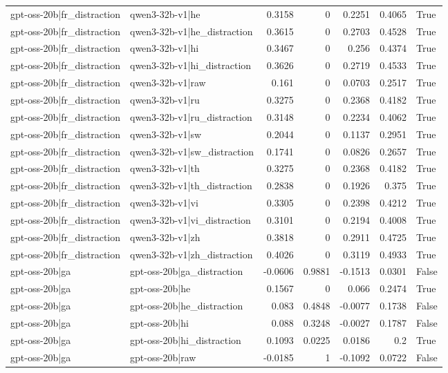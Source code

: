 \begin{table}
\begin{tabular}{l l r r r r l}
gpt-oss-20b|fr_distraction & qwen3-32b-v1|he & 0.3158 & 0 & 0.2251 & 0.4065 & True \\
gpt-oss-20b|fr_distraction & qwen3-32b-v1|he_distraction & 0.3615 & 0 & 0.2703 & 0.4528 & True \\
gpt-oss-20b|fr_distraction & qwen3-32b-v1|hi & 0.3467 & 0 & 0.256 & 0.4374 & True \\
gpt-oss-20b|fr_distraction & qwen3-32b-v1|hi_distraction & 0.3626 & 0 & 0.2719 & 0.4533 & True \\
gpt-oss-20b|fr_distraction & qwen3-32b-v1|raw & 0.161 & 0 & 0.0703 & 0.2517 & True \\
gpt-oss-20b|fr_distraction & qwen3-32b-v1|ru & 0.3275 & 0 & 0.2368 & 0.4182 & True \\
gpt-oss-20b|fr_distraction & qwen3-32b-v1|ru_distraction & 0.3148 & 0 & 0.2234 & 0.4062 & True \\
gpt-oss-20b|fr_distraction & qwen3-32b-v1|sw & 0.2044 & 0 & 0.1137 & 0.2951 & True \\
gpt-oss-20b|fr_distraction & qwen3-32b-v1|sw_distraction & 0.1741 & 0 & 0.0826 & 0.2657 & True \\
gpt-oss-20b|fr_distraction & qwen3-32b-v1|th & 0.3275 & 0 & 0.2368 & 0.4182 & True \\
gpt-oss-20b|fr_distraction & qwen3-32b-v1|th_distraction & 0.2838 & 0 & 0.1926 & 0.375 & True \\
gpt-oss-20b|fr_distraction & qwen3-32b-v1|vi & 0.3305 & 0 & 0.2398 & 0.4212 & True \\
gpt-oss-20b|fr_distraction & qwen3-32b-v1|vi_distraction & 0.3101 & 0 & 0.2194 & 0.4008 & True \\
gpt-oss-20b|fr_distraction & qwen3-32b-v1|zh & 0.3818 & 0 & 0.2911 & 0.4725 & True \\
gpt-oss-20b|fr_distraction & qwen3-32b-v1|zh_distraction & 0.4026 & 0 & 0.3119 & 0.4933 & True \\
gpt-oss-20b|ga & gpt-oss-20b|ga_distraction & -0.0606 & 0.9881 & -0.1513 & 0.0301 & False \\
gpt-oss-20b|ga & gpt-oss-20b|he & 0.1567 & 0 & 0.066 & 0.2474 & True \\
gpt-oss-20b|ga & gpt-oss-20b|he_distraction & 0.083 & 0.4848 & -0.0077 & 0.1738 & False \\
gpt-oss-20b|ga & gpt-oss-20b|hi & 0.088 & 0.3248 & -0.0027 & 0.1787 & False \\
gpt-oss-20b|ga & gpt-oss-20b|hi_distraction & 0.1093 & 0.0225 & 0.0186 & 0.2 & True \\
gpt-oss-20b|ga & gpt-oss-20b|raw & -0.0185 & 1 & -0.1092 & 0.0722 & False \\

\end{tabular}
\end{table}

